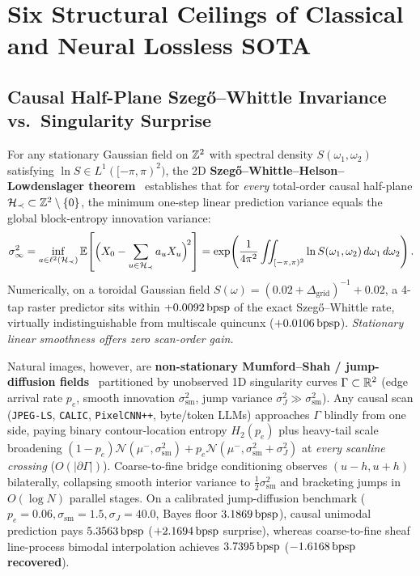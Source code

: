 \section{Six Structural Ceilings of Classical and Neural Lossless SOTA}
\label{sec:ceilings}

\subsection{Causal Half-Plane Szeg\H{o}--Whittle Invariance vs.\ Singularity Surprise}
For any stationary Gaussian field on $\mathbb{Z}^2$ with spectral density $S(\omega_1,\omega_2)$ satisfying $\ln S \in L^1([-\pi,\pi)^2)$, the 2D \textbf{Szeg\H{o}--Whittle--Helson--Lowdenslager theorem}~\citep{whittle1954,helson1958} establishes that for \emph{every} total-order causal half-plane $\mathcal{H}_\prec \subset \mathbb{Z}^2 \setminus \{0\}$, the minimum one-step linear prediction variance equals the global block-entropy innovation variance:
\begin{equation}
  \sigma_\infty^2 = \inf_{a \in \ell^2(\mathcal{H}_\prec)} \mathbb{E}\!\left[\Big(X_0 - \sum_{u \in \mathcal{H}_\prec} a_u X_u\Big)^{\!2}\right]
  = \exp\!\left(\frac{1}{4\pi^2}\iint_{[-\pi,\pi)^2} \ln S(\omega_1,\omega_2)\,d\omega_1\,d\omega_2\right).
\end{equation}
Numerically, on a toroidal Gaussian field $S(\omega) = (0.02 + \Delta_{\mathrm{grid}})^{-1} + 0.02$, a 4-tap raster predictor sits within $+0.0092\,\mathrm{bpsp}$ of the exact Szeg\H{o}--Whittle rate, virtually indistinguishable from multiscale quincunx ($+0.0106\,\mathrm{bpsp}$). \emph{Stationary linear smoothness offers zero scan-order gain.}

Natural images, however, are \textbf{non-stationary Mumford--Shah / jump-diffusion fields}~\citep{mumford1989} partitioned by unobserved 1D singularity curves $\Gamma \subset \mathbb{R}^2$ (edge arrival rate $p_e$, smooth innovation $\sigma_{\mathrm{sm}}^2$, jump variance $\sigma_J^2 \gg \sigma_{\mathrm{sm}}^2$). Any causal scan (\texttt{JPEG-LS}, \texttt{CALIC}, \texttt{PixelCNN++}, byte/token LLMs) approaches $\Gamma$ blindly from one side, paying binary contour-location entropy $H_2(p_e)$ plus heavy-tail scale broadening $(1-p_e)\mathcal{N}(\mu^-,\sigma_{\mathrm{sm}}^2) + p_e\mathcal{N}(\mu^-,\sigma_{\mathrm{sm}}^2+\sigma_J^2)$ at \emph{every scanline crossing} ($O(|\partial\Gamma|)$). Coarse-to-fine bridge conditioning observes $(u-h, u+h)$ bilaterally, collapsing smooth interior variance to $\frac{1}{2}\sigma_{\mathrm{sm}}^2$ and bracketing jumps in $O(\log N)$ parallel stages. On a calibrated jump-diffusion benchmark ($p_e=0.06,\sigma_{\mathrm{sm}}=1.5,\sigma_J=40.0$, Bayes floor $3.1869\,\mathrm{bpsp}$), causal unimodal prediction pays $5.3563\,\mathrm{bpsp}$ ($+2.1694\,\mathrm{bpsp}$ surprise), whereas coarse-to-fine sheaf line-process bimodal interpolation achieves $3.7395\,\mathrm{bpsp}$ (\textbf{$-1.6168\,\mathrm{bpsp}$ recovered}).

